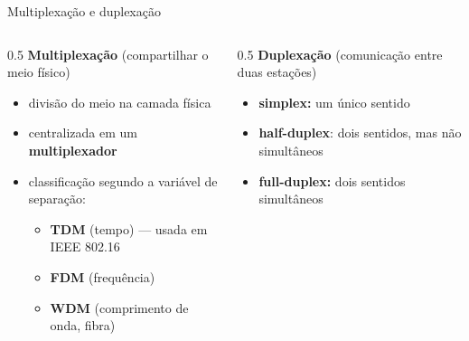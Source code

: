 \documentclass[aspectratio=169,11pt]{beamer}
\begin{document}
\begin{frame}{Multiplexação e duplexação}
  \begin{columns}
    \begin{column}{0.5\textwidth}
      \textbf{Multiplexação} (compartilhar o meio físico)
      \begin{itemize}
        \item divisão do meio na camada física
        \item centralizada em um \textbf{multiplexador}
        \item classificação segundo a variável de separação:
          \begin{itemize}
            \item \textbf{TDM} (tempo) --- usada em IEEE 802.16
            \item \textbf{FDM} (frequência)
            \item \textbf{WDM} (comprimento de onda, fibra)
          \end{itemize}
      \end{itemize}
    \end{column}
    \begin{column}{0.5\textwidth}
      \textbf{Duplexação} (comunicação entre duas estações)
      \begin{itemize}
        \item \textbf{simplex:} um único sentido
        \item \textbf{half-duplex}: dois sentidos, mas não simultâneos
        \item \textbf{full-duplex:} dois sentidos simultâneos
      \end{itemize}
      \begin{center}
      \end{center}
    \end{column}
  \end{columns}
\end{frame}
\end{document}
